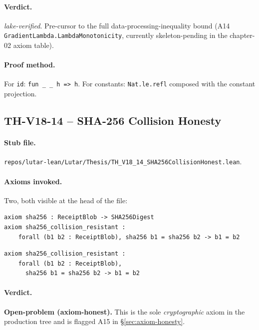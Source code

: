 \paragraph{Verdict.} \emph{lake-verified}. Pre-cursor to the full
data-processing-inequality bound (A14
\texttt{GradientLambda.LambdaMonotonicity}, currently
skeleton-pending in the chapter-02 axiom table).

\paragraph{Proof method.} For \texttt{id}: \texttt{fun \_ \_ h => h}.
For constants: \texttt{Nat.le.refl} composed with the constant
projection.

\subsection{TH-V18-14 -- SHA-256 Collision Honesty}
\label{sub:thv18-14}

\paragraph{Stub file.}
\texttt{repos/lutar-lean/Lutar/Thesis/TH\_V18\_14\_SHA256CollisionHonest.lean}.

\paragraph{Axioms invoked.} Two, both visible at the head of the file:
\begin{verbatim}
axiom sha256 : ReceiptBlob -> SHA256Digest
axiom sha256_collision_resistant :
    forall (b1 b2 : ReceiptBlob), sha256 b1 = sha256 b2 -> b1 = b2
\end{verbatim}

\begin{theorem}
\label{thm:thv18-14}
\begin{verbatim}
axiom sha256_collision_resistant :
    forall (b1 b2 : ReceiptBlob),
      sha256 b1 = sha256 b2 -> b1 = b2
\end{verbatim}
\end{theorem}

\paragraph{Verdict.} \textbf{Open-problem (axiom-honest).} This is the
sole \emph{cryptographic} axiom in the production tree and is
flagged A15 in \S\ref{sec:axiom-honesty}.

